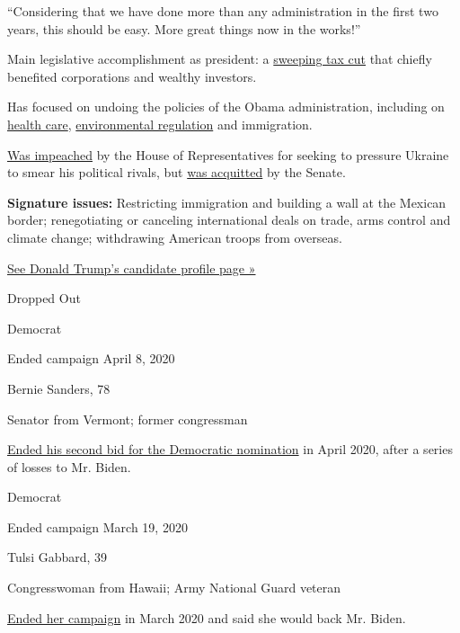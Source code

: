 ``Considering that we have done more than any administration in the
first two years, this should be easy. More great things now in the
works!''

Main legislative accomplishment as president: a
\href{https://www.nytimes.com/2017/12/22/us/politics/trump-tax-bill.html?module=inline}{sweeping
tax cut} that chiefly benefited corporations and wealthy investors.

Has focused on undoing the policies of the Obama administration,
including on
\href{https://www.nytimes.com/interactive/2017/07/19/us/what-trump-can-do-to-let-obamacare-fail.html}{health
care},
\href{https://www.nytimes.com/interactive/2018/12/26/us/politics/donald-trump-environmental-regulation.html?module=inline}{environmental
regulation} and immigration.

\href{https://www.nytimes.com/2019/12/18/us/politics/trump-impeached.html}{Was
impeached} by the House of Representatives for seeking to pressure
Ukraine to smear his political rivals, but
\href{https://www.nytimes.com/2020/02/05/us/politics/trump-acquitted-impeachment.html}{was
acquitted} by the Senate.

\textbf{Signature issues:} Restricting immigration and building a wall
at the Mexican border; renegotiating or canceling international deals on
trade, arms control and climate change; withdrawing American troops from
overseas.

\href{https://www.nytimes.com/interactive/2020/us/elections/donald-trump.html}{See
Donald Trump's candidate profile page »}

Dropped Out

Democrat

Ended campaign April 8, 2020

Bernie Sanders, 78

Senator from Vermont; former congressman

\href{https://www.nytimes.com/2020/04/08/us/politics/bernie-sanders-drops-out.html}{Ended
his second bid for the Democratic nomination} in April 2020, after a
series of losses to Mr. Biden.

Democrat

Ended campaign March 19, 2020

Tulsi Gabbard, 39

Congresswoman from Hawaii; Army National Guard veteran

\href{https://www.nytimes.com/2020/03/19/us/politics/tulsi-gabbard-drops-out.html}{Ended
her campaign} in March 2020 and said she would back Mr. Biden.


